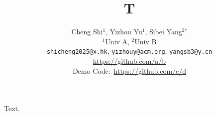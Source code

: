 \documentclass{article}
\title{T}
\author{Cheng Shi$^{1}$, Yizhou Yu$^{1}$, Sibei Yang$^{2}$$^{\dagger}$ \\ $^{1}$Univ A, $^{2}$Univ B \\
{\footnotesize\texttt{shicheng2025@x.hk},
\texttt{yizhouy@acm.org},
\texttt{yangsb3@y.cn}} \\ {\footnotesize \url{https://github.com/a/b}} \\ Demo Code:~\url{https://github.com/c/d}}
\begin{document}
\maketitle
Text.
\end{document}
